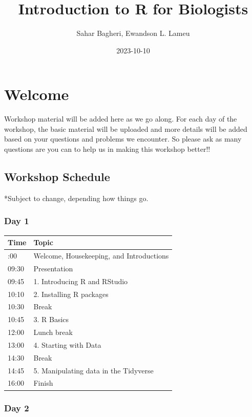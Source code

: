 \documentclass[
]{book}
\title{Introduction to R for Biologists}
\author{Sahar Bagheri, Ewandson L. Lameu}
\date{2023-10-10}
\begin{document}
\maketitle

{
\setcounter{tocdepth}{1}
\tableofcontents
}
\chapter{Welcome}\label{welcome}

Workshop material will be added here as we go along. For each day of the workshop, the basic material will be uploaded and more details will be added based on your questions and problems we encounter. So please ask as many questions are you can to help us in making this workshop better!!

\section{Workshop Schedule}\label{workshop-schedule}

*Subject to change, depending how things go.

\subsection*{Day 1}\label{day-1}

\begin{longtable}[]{@{}ll@{}}
\toprule\noalign{}
Time & Topic \\
\midrule\noalign{}
\endhead
\bottomrule\noalign{}
\endlastfoot
09:00 & Welcome, Housekeeping, and Introductions \\
09:30 & Presentation \\
09:45 & 1. Introducing R and RStudio \\
10:10 & 2. Installing R packages \\
10:30 & Break \\
10:45 & 3. R Basics \\
12:00 & Lunch break \\
13:00 & 4. Starting with Data \\
14:30 & Break \\
14:45 & 5. Manipulating data in the Tidyverse \\
16:00 & Finish \\
\end{longtable}

\subsection*{Day 2}\label{day-2}
\end{document}

